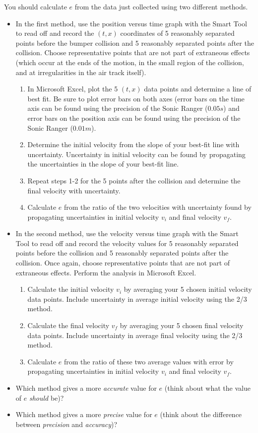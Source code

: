 You should calculate $e$ from the data just collected using two different methods. \myskip
\begin{itemize}
\item In the first method, use the position versus time graph with the Smart Tool to read off and record the $(t,x)$ coordinates of 5 reasonably separated points before the bumper collision and 5 reasonably separated points after the collision.  Choose representative points that are not part of extraneous effects (which occur at the ends of the motion, in the small region of the collision, and at irregularities in the air track itself).
\begin{enumerate}
\item In Microsoft Excel, plot the 5 $(t,x)$ data points and determine a line of best fit. Be sure to plot error bars on both axes (error bars on the time axis can be found using the precision of the Sonic Ranger ($0.05 s$) and error bars on the position axis can be found using the precision of the Sonic Ranger ($0.01 m$).
\item Determine the initial velocity from the slope of your best-fit line with uncertainty. Uncertainty in initial velocity can be found by propagating the uncertainties in the slope of your best-fit line.
\item    Repeat steps 1-2 for the 5 points after the collision and determine the final velocity with uncertainty.
    \item Calculate $e$ from the ratio of the two velocities with uncertainty found by propagating uncertainties in initial velocity $v_i$ and final velocity $v_f$.
\end{enumerate}

\item In the second method, use the velocity versus time graph with the Smart Tool to read off and record the velocity values for 5 reasonably separated points before the collision and 5 reasonably separated points after the collision.  Once again, choose representative points that are not part of extraneous effects. Perform the analysis in Microsoft Excel.
\begin{enumerate}
\item Calculate the initial velocity $v_i$ by averaging your 5 chosen initial velocity data points. Include uncertainty in average initial velocity using the 2/3 method.
\item Calculate the final velocity $v_f$ by averaging your 5 chosen final velocity data points. Include uncertainty in average final velocity using the 2/3 method.
    \item Calculate $e$ from the ratio of these two average values with error by propagating uncertainties in initial velocity $v_i$ and final velocity $v_f$.
        \end{enumerate}
    \item Which method  gives a more {\it{accurate}} value for $e$ (think about what the value of $e$ {\it{should}} be)?
    \item Which method gives a more {\it{precise}} value for $e$ (think about the difference between {\it{precision}} and {\it{accuracy}})?
\end{itemize}
